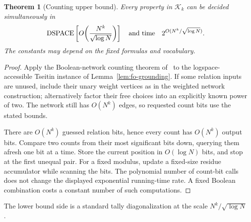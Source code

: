\documentclass[11pt]{article}
\newtheorem{theorem}{Theorem}[section]
\theoremstyle{definition}
\theoremstyle{remark}
\begin{document}
\begin{theorem}[Counting upper bound]
\label{thm:fo-counting-upper}
Every property in $\mathcal K_k$ can be decided simultaneously in
\[
 \mathrm{DSPACE}\left[O\!\left(\frac{N^k}{\sqrt{\log N}}\right)\right]
 \quad\hbox{and time}\quad
 2^{O(N^k/\sqrt{\log N})}.
\]
The constants may depend on the fixed formulas and vocabulary.
\end{theorem}
\begin{proof}
Apply the Boolean-network counting theorem of~\cite{Cruz26} to the
logspace-accessible Tseitin instance of Lemma~\ref{lem:fo-grounding}. If some relation inputs
are unused, include their unary weight vertices as in the weighted
network construction; alternatively factor their free choices into
an explicitly known power of two. The network still has $O(N^k)$
edges, so requested count bits use the stated bounds.

There are $O(N^k)$ guessed relation bits, hence every count has
$O(N^k)$ output bits. Compare two counts from their most significant
bits down, querying them afresh one bit at a time. Store the current
position in $O(\log N)$ bits, and stop at the first unequal pair.
For a fixed modulus, update a fixed-size residue accumulator while
scanning the bits. The polynomial number of count-bit calls does not
change the displayed exponential running-time rate. A fixed Boolean
combination costs a constant number of such computations.
\end{proof}

The lower bound side is a standard tally diagonalization at the scale
$N^k/\sqrt{\log N}$.
\end{document}
